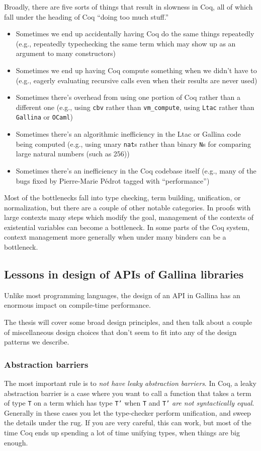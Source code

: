 \documentclass[twoside]{article}
\begin{document}
Broadly, there are five sorts of things that result in slowness in Coq, all of which fall under the heading of Coq ``doing too much stuff.''
\begin{itemize}
\item
  Sometimes we end up accidentally having Coq do the same things repeatedly (e.g., repeatedly typechecking the same term which may show up as an argument to many constructors)
\item
  Sometimes we end up having Coq compute something when we didn't have to (e.g., eagerly evaluating recursive calls even when their results are never used)
\item
  Sometimes there's overhead from using one portion of Coq rather than a different one (e.g., using \texttt{cbv} rather than \texttt{vm\_compute}, using \texttt{Ltac} rather than \texttt{Gallina} or \texttt{OCaml})
\item
  Sometimes there's an algorithmic inefficiency in the Ltac or Gallina code being computed (e.g., using unary \texttt{nat}s rather than binary \texttt{N}s for comparing large natural numbers (such as 256))
\item
  Sometimes there's an inefficiency in the Coq codebase itself (e.g., many of the bugs fixed by Pierre-Marie P\'edrot tagged with ``performance'')
\end{itemize}

Most of the bottlenecks fall into type checking, term building, unification, or normalization, but there are a couple of other notable categories.
In proofs with large contexts many steps which modify the goal, management of the contexts of existential variables can become a bottleneck.
In some parts of the Coq system, context management more generally when under many binders can be a bottleneck.

\subsection{Lessons in design of APIs of Gallina libraries}

Unlike most programming languages, the design of an API in Gallina has an enormous impact on compile-time performance.

The thesis will cover some broad design principles, and then talk about a couple of miscellaneous design choices that don't seem to fit into any of the design patterns we describe.

\subsubsection{Abstraction barriers}
The most important rule is to \emph{not have leaky abstraction barriers}.
In Coq, a leaky abstraction barrier is a case where you want to call a function that takes a term of type \texttt{T} on a term which has type \texttt{T'} when \texttt{T} and \texttt{T'} \emph{are not syntactically equal}.
Generally in these cases you let the type-checker perform unification, and sweep the details under the rug.
If you are very careful, this can work, but most of the time Coq ends up spending a lot of time unifying types, when things are big enough.
\end{document}

